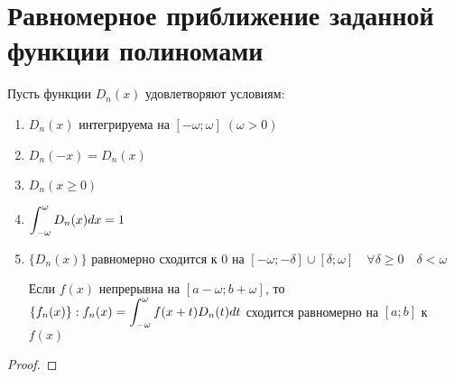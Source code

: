 \section{Равномерное приближение заданной функции полиномами}

\begin{theorem}
    Пусть функции $D_n(x)$ удовлетворяют условиям:

    \begin{enumerate}
        \item $D_n(x)$ интегрируема на $[-\omega; \omega] \; (\omega > 0)$
        \item $D_n(-x) = D_n(x)$
        \item $D_n(x \geq 0)$
        \item $\displaystyle\int_{-\omega}^\omega D_n(x) dx = 1$
        \item 
            $\{ D_n(x) \}$ равномерно сходится к $0$ на 
            $[-\omega; -\delta] \cup [\delta; \omega] \quad
            \forall \delta \geq 0 \quad \delta < \omega$

            Если $f(x)$ непрерывна на $[a - \omega; b + \omega]$, то
            $\{ f_n(x) \} : f_n(x) = 
            \displaystyle\int_{-\omega}^\omega f(x + t) D_n(t) dt$ сходится равномерно 
            на $[a; b]$ к $f(x)$
    \end{enumerate}
\end{theorem}
\begin{proof}
    
\end{proof}
